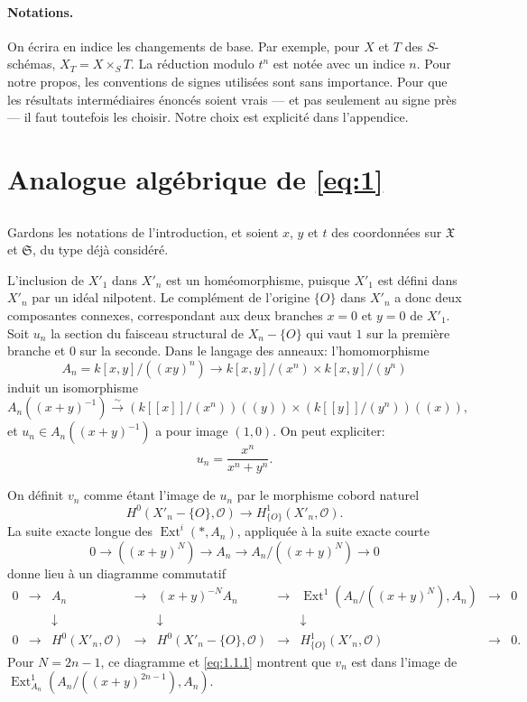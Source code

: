 \documentclass[12pt,a4paper]{article}
\theoremstyle{plain}
\theoremstyle{definition}
\theoremstyle{remark}
\DeclareMathOperator{\Ext}{Ext}
\newcommand{\OO}{\mathcal{O}}
\providecommand{\Ext}{\operatorname{Ext}}
\begin{document}
\paragraph{Notations.} On écrira en indice les changements de base. Par exemple, pour $X$
et $T$ des $S$-schémas, $X_T=X\times_S T$. La réduction modulo $t^n$ est notée avec un
indice $n$. Pour notre propos, les conventions de signes utilisées sont sans importance.
Pour que les résultats intermédiaires énoncés soient vrais --- et pas seulement au signe
près --- il faut toutefois les choisir. Notre choix est explicité dans l'appendice.


\section{Analogue algébrique de \eqref{eq:1}}

\subsection{}

Gardons les notations de l'introduction, et soient $x$, $y$ et $t$ des coordonnées
sur $\mathfrak{X}$ et $\mathfrak{S}$, du type déjà considéré.

L'inclusion de $X'_1$ dans $X'_n$ est un homéomorphisme, puisque $X'_1$ est défini
dans $X'_n$ par un idéal nilpotent. Le complément de l'origine $\{O\}$ dans $X'_n$ a
donc deux composantes connexes, correspondant aux deux branches $x=0$ et $y=0$ de
$X'_1$. Soit $u_n$ la section du faisceau structural de $X_n-\{O\}$ qui vaut $1$ sur
la première branche et $0$ sur la seconde. Dans le langage des anneaux:
l'homomorphisme
\[
A_n=k[x,y]/((xy)^n)\to k[x,y]/(x^n)\times k[x,y]/(y^n)
\]
induit un isomorphisme
\[
A_n((x+y)^{-1})\xrightarrow{\sim}(k[[x]]/(x^n))((y))\times (k[[y]]/(y^n))((x)),
\]
et $u_n\in A_n((x+y)^{-1})$ a pour image $(1,0)$. On peut expliciter:
\begin{equation}\label{eq:1.1.1}
u_n=\frac{x^n}{x^n+y^n}.
\end{equation}

On définit $v_n$ comme étant l'image de $u_n$ par le morphisme cobord naturel
\[
H^0(X'_n-\{O\},\OO)\to H^1_{\{O\}}(X'_n,\OO).
\]
La suite exacte longue des $\Ext^i(*,A_n)$, appliquée à la suite exacte courte
\[
0\to ((x+y)^N)\to A_n\to A_n/((x+y)^N)\to 0
\]
donne lieu à un diagramme commutatif
\[
\begin{array}{ccccccccc}
0 & \to & A_n & \to & (x+y)^{-N}A_n & \to & \Ext^1(A_n/((x+y)^N),A_n) & \to & 0 \\
  &     & \downarrow &   & \downarrow &   & \downarrow &   &   \\
0 & \to & H^0(X'_n,\OO) & \to & H^0(X'_n-\{O\},\OO) & \to & H^1_{\{O\}}(X'_n,\OO) & \to & 0.
\end{array}
\]
Pour $N=2n-1$, ce diagramme et \eqref{eq:1.1.1} montrent que $v_n$ est dans l'image de
$\Ext^1_{A_n}(A_n/((x+y)^{2n-1}),A_n)$.
\end{document}
